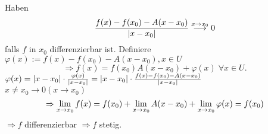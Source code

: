 \documentclass[../ana2.tex]{subfiles}
\begin{document}
Haben
\[ \frac{f(x) - f(x_0) - A(x-x_0)}{\left|x-x_0\right|} 
\overset{x \rightarrow x_0}{\longrightarrow} 0 \]
falls \( f \) in \(x_0\) differenzierbar ist.
Definiere \( \varphi(x) := f(x)-f(x_0)-A(x-x_0), x \in U \)
\[ \Rightarrow f(x) = f(x_0) A(x - x_0) + \varphi(x) 
\;\forall x \in U. \]
\( \varphi(x) = \left|x-x_0\right| \cdot 
\frac{\varphi(x)}{\left|x-x_0\right|}
= \left|x-x_0\right| \cdot \frac{f(x)-f(x_0)-A(x-x_0)}{\left|x-x_0\right|} \) \\
\( x \neq x_0 \rightarrow 0 (x \rightarrow x_0) \)
\[ \Rightarrow \lim\limits_{x\rightarrow{}x_0} f(x) = f(x_0) 
+ \lim\limits_{x\rightarrow{}x_0} A(x-x_0) 
+ \lim\limits_{x\rightarrow{}x_0} \varphi(x) = f(x_0) \]
\( \Rightarrow f \) differenzierbar \( \Rightarrow f \) stetig.
\end{document}
